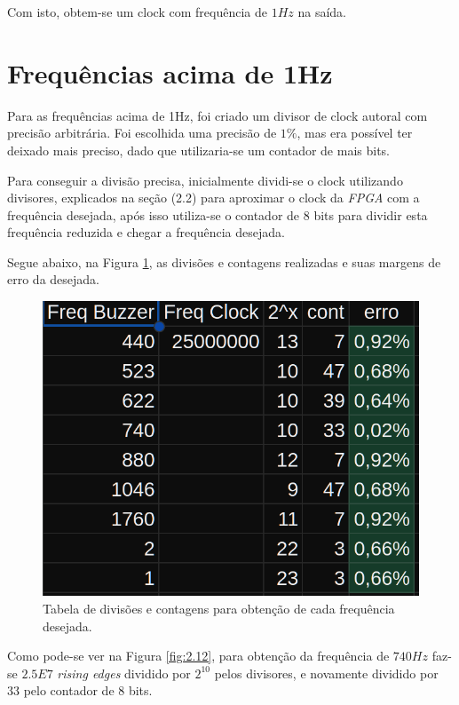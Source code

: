 Com isto, obtem-se um clock com frequência de $1Hz$ na saída.

\section{Frequências acima de 1Hz}

Para as frequências acima de 1Hz, foi criado um divisor de clock autoral com precisão arbitrária. Foi escolhida uma precisão de $1\%$, mas era possível ter deixado mais preciso, dado que utilizaria-se um contador de mais bits.

Para conseguir a divisão precisa, inicialmente dividi-se o clock utilizando divisores, explicados na seção (2.2) para aproximar o clock da \emph{FPGA} com a frequência desejada, após isso utiliza-se o contador de 8 bits para dividir esta frequência reduzida e chegar a frequência desejada.

Segue abaixo, na Figura \ref{fig:2.11}, as divisões e contagens realizadas e suas margens de erro da desejada.

\begin{figure}[H]
	\centering
	\includegraphics[width=1\columnwidth]{FIGURAS/cap_2/freq_tabela.png}
	\caption{Tabela de divisões e contagens para obtenção de cada frequência desejada.}
        \label{fig:2.11}
\end{figure}

Como pode-se ver na Figura \ref{fig:2.12}, para obtenção da frequência de $740Hz$ faz-se $2.5E7$ \emph{rising edges} dividido por $2^{10}$ pelos divisores, e novamente dividido por $33$ pelo contador de 8 bits.


